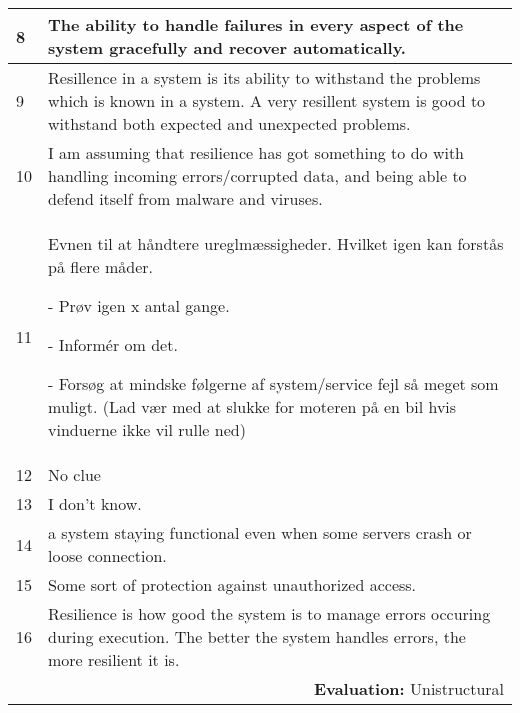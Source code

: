 \begin{longtable}{|p{0.3cm}|p{14.7cm}|}
8 & The ability to handle failures in every aspect of the system gracefully and recover automatically. \\ \hline

9 & Resillence in a system is its ability to withstand the problems which is known in a system. A very resillent system is good to withstand both expected and unexpected problems. \\ \hline

10 & I am assuming that resilience has got something to do with handling incoming errors/corrupted data, and being able to defend itself from malware and viruses. \\ \hline

11 & Evnen til at håndtere ureglmæssigheder. Hvilket igen kan forstås på flere måder.

\noindent- Prøv igen x antal gange.

\noindent - Informér om det.

\noindent - Forsøg at mindske følgerne af system/service fejl så meget som muligt. (Lad vær med at slukke for moteren på en bil hvis vinduerne ikke vil rulle ned) \\ \hline

12 & No clue \\ \hline

13 & I don't know. \\ \hline

14 & a system staying functional even when some servers crash or loose connection. \\ \hline

15 & Some sort of protection against unauthorized access.\\ \hline

16 & Resilience is how good the system is to manage errors occuring during execution. The better the system handles errors, the more resilient it is.\\ \hline

\multicolumn{2}{r}{\textbf{Evaluation:} Unistructural} \\ 

\end{longtable}
\normalsize
